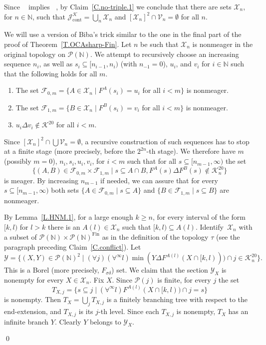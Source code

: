\documentclass{amsart}
\makeatletter
\def\Fin{{\rm Fin}}   %
\theoremstyle{definition}
\theoremstyle{remark}
\def\Fin{\operatorname{Fin}}
\DeclareMathOperator{\Ccont}{cont}
\newcommand{\Jcont}{\cJ_{\Ccont}}
\newcommand{\cK}{{\mathcal K}}
\renewcommand{\proofname}{Proof}
\renewenvironment{proof}[1][\proofname]{\par
\let\oldqedsymbol\qedsymbol             %
  \normalfont
  \topsep6\p@\@plus6\p@ \trivlist
  \item[\hskip\labelsep\hskip\parindent\scshape
    #1\@addpunct{.}]\ignorespaces
}{%
  \qed\endtrivlist
\global\let\qedsymbol\oldqedsymbol      %
}
\newcommand{\cP}{\mathcal P}
\newcommand{\bbN}{\mathbb N}
\newcommand{\cJ}{{\mathcal J}} %
\newcommand{\cV}{\mathcal V}
\newcommand{\cX}{\mathcal X}
\newcommand{\cY}{\mathcal Y}
\newcommand{\cF}{\mathcal F}
\DeclareMathOperator{\OCAT}{OCA_T}
\DeclareMathOperator{\OCAsharp}{OCA^\#}
\newcommand{\cPN}{\cP(\bbN)}
\numberwithin{claim}{subsection}
\makeatother
\begin{document}
\begin{proof}
	
	Since $\OCAT$ implies $\OCAsharp$, by Claim~\ref{C.no-triple.1} we conclude that there are sets $\cX_n$, for $n\in \bbN$, such that  $\Jcont^\cK=\bigcup_n \cX_n$ and $[\cX_n]^2\cap \cV_n=\emptyset$  for all $n$. 

	We will use a version of Biba's trick similar to the one in  the final part of the proof of Theorem~\ref{T.OCAsharp-Fin}. 
			Let $n$ be such that $\cX_n$ is nonmeager in the original topology on $\cP(\bbN)$. We attempt to recursively choose an increasing sequence $n_i$, as well as $s_i\subseteq [n_{i-1},n_{i})$ (with $n_{-1}=0$), $u_i$, and $v_i$  for $i\in \bbN$ such that the following holds for all $m$.
	\begin{enumerate}
		\item The set $\cF_{0,m}=\{A\in \cX_n\mid F^A(s_i)=u_i$ for all $i<m\}$ is nonmeager. 
		\item The set $\cF_{1,m}=\{B\in \cX_n\mid F^B(s_i)=v_i$ for all $i<m\}$ is nonmeager.
		\item $u_i\Delta v_i\notin \cK^{20}$ for all $i<m$. 
	\end{enumerate} 
	Since $[\cX_n]^2\cap \bigcup\cV_n=\emptyset$, a recursive construction of such sequences has to stop at a finite stage (more precisely, before the $2^{2n}$-th stage). We therefore have $m$ (possibly $m=0$), $n_i,s_i,u_i, v_i$, for $i<m$ such that for all $s\subseteq [n_{m-1},\infty)$ the set 
	\[
	\{(A,B)\in \cF_{0,m}\times \cF_{1,m}\mid s\subseteq A\cap B, F^A(s)\Delta F^B(s)\notin \cK_n^{20}\}
	\]
	is meager.  By increasing $n_{m-1}$ if needed, we can assure that for every $s\subseteq [n_{m-1}, \infty)$ both sets $\{A\in \cF_{0,m}\mid s\subseteq A\}$ and $\{B\in \cF_{1,m}\mid s\subseteq B\}$ are nonmeager. 
	
	
	
	By Lemma~\ref{L.HNM.1}, for a  large enough $k\geq n$, for every interval of the form $[k,l)$ for $l>k$ there is an $A(l)\in \cX_n$ such that $[k,l)\subseteq A(l)$. Identify~$\cX_n$ with a subset of $\cP(\bbN)\times \cP(\bbN)^{\Fin}$ as in the definition of the topology $\tau$  (see the paragraph preceding Claim~\ref{C.conflict}). 
Let 
\[
\cY=\{(X,Y)\in \cPN^2\mid(\forall j)(\forall^\infty l) \min(Y\Delta F^{A(l)} (X\cap [k,l)))\cap j\in \cK_n^{20} \}.
\]
This is a Borel (more precisely, $F_{\sigma\delta}$) set. We claim that the section $\cY_X$ is nonempty for every $X\in \cX_n$. Fix $X$. Since $\cP(j)$ is finite, for every $j$ the set 
\[
T_{X,j}=\{s\subseteq j\mid (\forall^\infty l) F^{A(l)} (X\cap [k,l))\cap j=s\}
\] 
is nonempty. Then $T_X=\bigcup_j T_{X,j}$ is a finitely branching tree with respect to the end-extension,  and $T_{X,j}$ is its $j$-th level. Since each $T_{X,j}$ is nonempty, $T_X$ has an infinite branch $Y$. Clearly $Y$  belongs to $\cY_X$. 


\end{proof}
\end{document}
